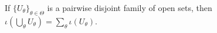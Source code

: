 If $\{U_{\theta}\}_{\theta \in \Theta}$ is a pairwise disjoint family of open sets, then $\iota(\bigcup_{\theta} U_{\theta}) = \sum_{\theta} \iota(U_{\theta})$.
